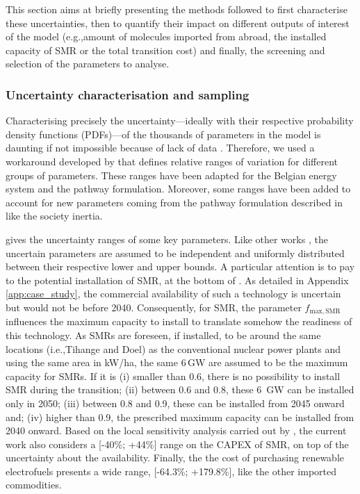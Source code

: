 \documentclass[11pt,twoside,a4paper,english]{article}
\def\eg{e.g.,}
\def\ie{i.e.,}
\begin{document}
\begin{appendices}
This section aims at briefly presenting the methods followed to first characterise these uncertainties, then to quantify their impact on different outputs of interest of the model (\eg amount of molecules imported from abroad, the installed capacity of \gls{SMR} or the total transition cost) and finally, the screening and selection of the parameters to analyse.

\subsubsection{Uncertainty characterisation and sampling}
\label{subsubsec:UQ:UC}
Characterising precisely the uncertainty---ideally with their respective probability density functions (PDFs)---of the thousands of parameters in the model is daunting if not impossible because of lack of data \cite{marnay2006addressing}. Therefore, we used a workaround developed by \citet{Moret2017} that defines relative ranges of variation for different groups of parameters. These ranges have been adapted for the Belgian energy system and the pathway formulation. Moreover, some ranges have been added to account for new parameters coming from the pathway formulation described in  like the society inertia.

 gives the uncertainty ranges of some key parameters. Like other works \cite{li2019renewables,coppitters2021robust}, the uncertain parameters are assumed to be independent and uniformly distributed between their respective lower and upper bounds. A particular attention is to pay to the potential installation of \gls{SMR}, at the bottom of . As detailed in Appendix \ref{app:case_study}, the commercial availability of such a technology is uncertain but would not be before 2040. Consequently, for \gls{SMR}, the parameter $f_{\mathrm{max,SMR}}$ influences the maximum capacity to install to translate somehow the readiness of this technology. As SMRs are foreseen, if installed, to be around the same locations (\ie Tihange and Doel) as the conventional nuclear power plants and using the same area in kW/ha, the same 6\,GW are assumed to be the maximum capacity for SMRs. If it is (i) smaller than 0.6, there is no possibility to install \gls{SMR} during the transition; (ii) between 0.6 and 0.8, these 6~GW can be installed only in 2050; (iii) between 0.8 and 0.9, these can be installed from 2045 onward and; (iv) higher than 0.9, the prescribed maximum capacity can be installed from 2040 onward. Based on the local sensitivity analysis carried out by \citet{PATHS2050}, the current work also considers a [-40\%; +44\%] range on the CAPEX of SMR, on top of the uncertainty about the availability. Finally, the the cost of purchasing renewable electrofuels presents a wide range, [-64.3\%; +179.8\%], like the other imported commodities.


\end{appendices}
\end{document}
